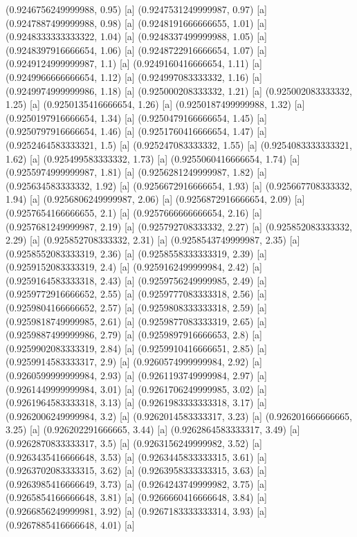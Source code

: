 {{{(0.9246756249999988, 0.95) [a] 
(0.9247531249999987, 0.97) [a] 
(0.9247887499999988, 0.98) [a] 
(0.9248191666666655, 1.01) [a] 
(0.9248333333333322, 1.04) [a] 
(0.9248337499999988, 1.05) [a] 
(0.9248397916666654, 1.06) [a] 
(0.9248722916666654, 1.07) [a] 
(0.9249124999999987, 1.1) [a] 
(0.9249160416666654, 1.11) [a] 
(0.9249966666666654, 1.12) [a] 
(0.924997083333332, 1.16) [a] 
(0.9249974999999986, 1.18) [a] 
(0.925000208333332, 1.21) [a] 
(0.925002083333332, 1.25) [a] 
(0.9250135416666654, 1.26) [a] 
(0.9250187499999988, 1.32) [a] 
(0.9250197916666654, 1.34) [a] 
(0.9250479166666654, 1.45) [a] 
(0.9250797916666654, 1.46) [a] 
(0.9251760416666654, 1.47) [a] 
(0.9252464583333321, 1.5) [a] 
(0.925247083333332, 1.55) [a] 
(0.9254083333333321, 1.62) [a] 
(0.925499583333332, 1.73) [a] 
(0.9255060416666654, 1.74) [a] 
(0.9255974999999987, 1.81) [a] 
(0.9256281249999987, 1.82) [a] 
(0.925634583333332, 1.92) [a] 
(0.9256672916666654, 1.93) [a] 
(0.925667708333332, 1.94) [a] 
(0.9256806249999987, 2.06) [a] 
(0.9256872916666654, 2.09) [a] 
(0.9257654166666655, 2.1) [a] 
(0.9257666666666654, 2.16) [a] 
(0.9257681249999987, 2.19) [a] 
(0.925792708333332, 2.27) [a] 
(0.925852083333332, 2.29) [a] 
(0.925852708333332, 2.31) [a] 
(0.9258543749999987, 2.35) [a] 
(0.9258552083333319, 2.36) [a] 
(0.9258558333333319, 2.39) [a] 
(0.9259152083333319, 2.4) [a] 
(0.9259162499999984, 2.42) [a] 
(0.9259164583333318, 2.43) [a] 
(0.9259756249999985, 2.49) [a] 
(0.9259772916666652, 2.55) [a] 
(0.9259777083333318, 2.56) [a] 
(0.9259804166666652, 2.57) [a] 
(0.9259808333333318, 2.59) [a] 
(0.9259818749999985, 2.61) [a] 
(0.9259877083333319, 2.65) [a] 
(0.9259887499999986, 2.79) [a] 
(0.9259897916666653, 2.8) [a] 
(0.9259902083333319, 2.84) [a] 
(0.9259910416666651, 2.85) [a] 
(0.9259914583333317, 2.9) [a] 
(0.9260574999999984, 2.92) [a] 
(0.9260599999999984, 2.93) [a] 
(0.9261193749999984, 2.97) [a] 
(0.9261449999999984, 3.01) [a] 
(0.9261706249999985, 3.02) [a] 
(0.9261964583333318, 3.13) [a] 
(0.9261983333333318, 3.17) [a] 
(0.9262006249999984, 3.2) [a] 
(0.9262014583333317, 3.23) [a] 
(0.926201666666665, 3.25) [a] 
(0.926202291666665, 3.44) [a] 
(0.9262864583333317, 3.49) [a] 
(0.9262870833333317, 3.5) [a] 
(0.9263156249999982, 3.52) [a] 
(0.9263435416666648, 3.53) [a] 
(0.9263445833333315, 3.61) [a] 
(0.9263702083333315, 3.62) [a] 
(0.9263958333333315, 3.63) [a] 
(0.9263985416666649, 3.73) [a] 
(0.9264243749999982, 3.75) [a] 
(0.9265854166666648, 3.81) [a] 
(0.9266660416666648, 3.84) [a] 
(0.9266856249999981, 3.92) [a] 
(0.9267183333333314, 3.93) [a] 
(0.9267885416666648, 4.01) [a] 
}}}
